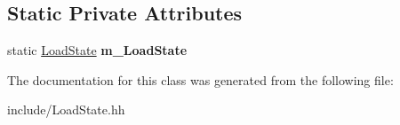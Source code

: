 \subsection*{Static Private Attributes}
\begin{DoxyCompactItemize}
\item 
\hypertarget{class_load_state_a5eaac73d0a8b16c5e4984534c6624372}{}static \hyperlink{class_load_state}{Load\+State} {\bfseries m\+\_\+\+Load\+State}\label{class_load_state_a5eaac73d0a8b16c5e4984534c6624372}

\end{DoxyCompactItemize}


The documentation for this class was generated from the following file\+:\begin{DoxyCompactItemize}
\item 
include/Load\+State.\+hh\end{DoxyCompactItemize}
